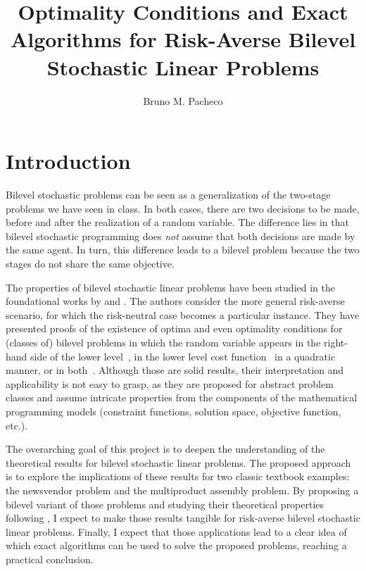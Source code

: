 \documentclass[12pt]{article}
\begin{document}
\title{Optimality Conditions and Exact Algorithms for Risk-Averse Bilevel Stochastic Linear Problems}

\author{Bruno M. Pacheco}

\maketitle


\section*{Introduction}

Bilevel stochastic problems can be seen as a generalization of the two-stage problems we have seen in class.
In both cases, there are two decisions to be made, before and after the realization of a random variable.
The difference lies in that bilevel stochastic programming does \emph{not} assume that both decisions are made by the same agent.
In turn, this difference leads to a bilevel problem because the two stages do not share the same objective.

The properties of bilevel stochastic linear problems have been studied in the foundational works by \citet{burtscheidtRiskAverseModelsBilevel2020} and \citet{clausExistenceSolutionsClass2022a,clausContinuityRiskaverseBilevel2021}.
The authors consider the more general risk-averse scenario, for which the risk-neutral case becomes a particular instance.
They have presented proofs of the existence of optima and even optimality conditions for (classes of) bilevel problems in which the random variable appears in the right-hand side of the lower level~\citep{burtscheidtRiskAverseModelsBilevel2020}, in the lower level cost function~\citep{clausContinuityRiskaverseBilevel2021} in a quadratic manner, or in both~\citep{clausExistenceSolutionsClass2022a}.
Although those are solid results, their interpretation and applicability is not easy to grasp, as they are proposed for abstract problem classes and assume intricate properties from the components of the mathematical programming models (constraint functions, solution space, objective function, etc.).

The overarching goal of this project is to deepen the understanding of the theoretical results for bilevel stochastic linear problems.
The proposed approach is to explore the implications of these results for two classic textbook examples: the newsvendor problem and the multiproduct assembly problem.
By proposing a bilevel variant of those problems and studying their theoretical properties following \citet{burtscheidtRiskAverseModelsBilevel2020}, I expect to make those results tangible for risk-averse bilevel stochastic linear problems.
Finally, I expect that those applications lead to a clear idea of which exact algorithms can be used to solve the proposed problems, reaching a practical conclusion.
\end{document}
